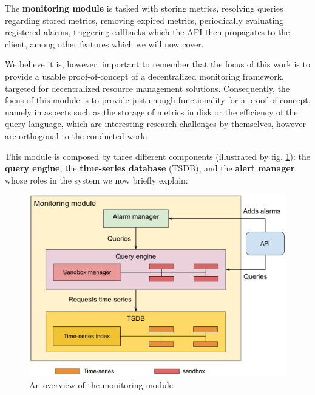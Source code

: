 

The \textbf{monitoring module} is tasked with storing metrics, resolving queries regarding stored metrics, removing expired metrics, periodically evaluating registered alarms, triggering callbacks which the API then propagates to the client, among other features which we will now cover.

We believe it is, however, important to remember that the focus of this work is to provide a usable proof-of-concept of a decentralized monitoring framework, targeted for decentralized resource management solutions. Consequently, the focus of this module is to provide just enough functionality for a proof of concept, namely in aspects such as the storage of metrics in disk or the efficiency of the query language, which are interesting research challenges by themselves, however are orthogonal to the conducted work. 

This module is composed by three different components (illustrated by fig. \ref{fig:mon_module_overview}): the \textbf{query engine}, the \textbf{time-series database} (TSDB), and the \textbf{alert manager}, whose roles in the system we now briefly explain:

\begin{figure}[htbp]
    \centering
    \includegraphics[width=\textwidth]{Chapters/mon_module/images/Monitoring_module.pdf}
    \caption{An overview of the monitoring module}
    \label{fig:mon_module_overview}
\end{figure}


